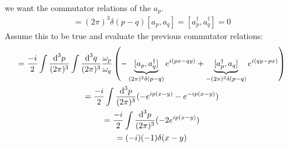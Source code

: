 \documentclass[]{scrartcl}
\begin{document}
we want the commutator relations of the $a_p$.
\begin{gather}
	[a_p, a_q^\dagger] = (2\pi)^3\delta(p-q)
	[a_p, a_q] = [a_p^\dagger, a_q^\dagger] = 0
\end{gather}
Assume this to be true and evaluate the previous commutator relations:
\begin{gather*}
	[\phi(x), \pi(y)] = \frac{-i}{2}\int\frac{\text d^3 p}{(2\pi)^3} \int \frac{\text d^3 q}{(2\pi)^3} \frac{\omega_p}{\omega_q}\left(-\underbrace{[a_p, a_q^\dagger]}_{(2\pi)^3\delta(p-q)}e^{i(px-qy)} + \underbrace{[a_p^\dagger, a_q]}_{-(2\pi)^3\delta(p-q)}e^{i(qy-px)}\right)\\
	= \frac{-i}{2}\int\frac{\text d^3p}{(2\pi)^3}(- e^{ip(x-y)} - e^{-ip(x-y)})\\
	= \frac{-i}{2}\int\frac{\text d^3p}{(2\pi)^3}(-2e^{ip(x-y)})\\
	= (-i)(-1)\delta(x-y)
\end{gather*}
\end{document}
